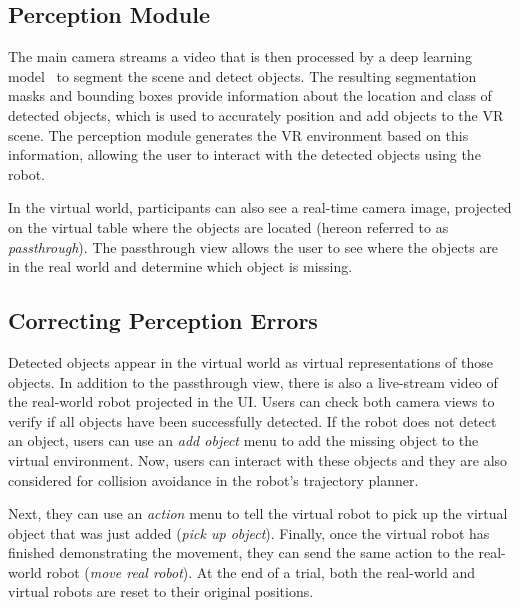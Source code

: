 \documentclass[letterpaper, 10 pt, conference]{ieeeconf}  %
\begin{document}

\subsection{Perception Module}
\label{subsec:perception}

The main camera streams a video that is then processed by a deep learning model~\cite{wu2019detectron2} to segment the scene and detect objects. The resulting segmentation masks and bounding boxes provide information about the location and class of detected objects, which is used to accurately position and add objects to the VR scene. The perception module generates the VR environment based on this information, allowing the user to interact with the detected objects using the robot. 

In the virtual world, participants can also see a real-time camera image, projected on the virtual table where the objects are located (hereon referred to as \textit{passthrough}). The passthrough view allows the user to see where the objects are in the real world and determine which object is missing.

\subsection{Correcting Perception Errors}
% 
Detected objects appear in the virtual world as virtual representations of those objects. In addition to the passthrough view, there is also a live-stream video of the real-world robot projected in the UI. Users can check both camera views to verify if all objects have been successfully detected. If the robot does not detect an object, users can use an \textit{add object} menu to add the missing object to the virtual environment. Now, users can interact with these objects and they are also considered for collision avoidance in the robot's trajectory planner.


Next, they can use an \textit{action} menu to tell the virtual robot to pick up the virtual object that was just added (\textit{pick up object}). Finally, once the virtual robot has finished demonstrating the movement, they can send the same action to the real-world robot (\textit{move real robot}). At the end of a trial, both the real-world and virtual robots are reset to their original positions.   
\end{document}
